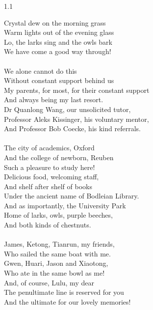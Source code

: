 \begin{spacing}{1.1}
\begin{acknowledgements}
	Crystal dew on the morning grass \\
	Warm lights out of the evening glass\\
	Lo, the larks sing and the owls bark\\ 
	We have come a good way through!\\
\\
	We alone cannot do this\\ 
	Without constant support behind us \\ 
	My parents, for most, for their constant support\\ 
	And always being my last resort. \\ 
	Dr Quanlong Wang, our unsolicited tutor, \\ 
	Professor Aleks Kissinger, his voluntary mentor, \\ 
	And Professor Bob Coecke, his kind referrals. \\
\\
	The city of academics, Oxford \\ 
	And the college of newborn, Reuben\\ 
	Such a pleasure to study here! \\ 
	Delicious food, welcoming staff, \\ 
	And shelf after shelf of books \\ 
	Under the ancient name of Bodleian Library.\\
	And as importantly, the University Park \\ 
	Home of larks, owls, purple beeches,\\
	And both kinds of chestnuts.\\
\\
	James, Ketong, Tianrun, my friends, \\ 
	Who sailed the same boat with me. \\
	Gwen, Huari, Jason and Xiaotong, \\
	Who ate in the same bowl as me! \\ 
	And, of course, Lulu, my dear \\ 
	The penultimate line is reserved for you \\ 
	And the ultimate for our lovely memories!\\
\end{acknowledgements} 
\end{spacing}
